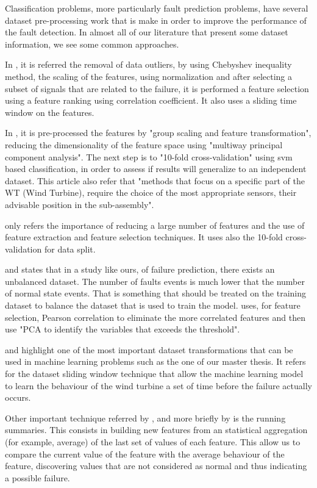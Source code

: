 Classification problems, more particularly fault prediction problems, have several dataset pre-processing work that is make in order to improve the performance of the fault detection. In almost all of our literature that present some dataset information, we see some common approaches.

In \cite{OLD_19_WIND}, it is referred the removal of data outliers, by using Chebyshev inequality method, the scaling of the features, using normalization and after selecting a subset of signals that are related to the failure, it is performed a feature selection using a feature ranking using correlation coefficient. It also uses a sliding time window on the features.

In \cite{N_2_WIND}, it is pre-processed the features by "group scaling and feature transformation", reducing the dimensionality of the feature space using "multiway principal component analysis". The next step is to "10-fold cross-validation" using \acrshort{svm} based classification, in order to assess if results will generalize to an independent dataset. This article also refer that "methods that focus on a specific part of the WT (Wind Turbine), require the choice of the most appropriate sensors, their advisable position in the sub-assembly".

\cite{39_WIND} only refers the importance of reducing a large number of features and the use of feature extraction and feature selection techniques. It uses also the 10-fold cross-validation for data split.

\cite{N_3_WIND} and \cite{OLD_41_WIND} states that in a study like ours, of failure prediction, there exists an unbalanced dataset. The number of faults events is much lower that the number of normal state events. That is something that should be treated on the training dataset to balance the dataset that is used to train the model.
\cite{N_4_WIND} uses, for feature selection, Pearson correlation to eliminate the more correlated features and then use "PCA to identify the variables that exceeds the threshold".

\cite{TDC_1} and \cite{MED_1} highlight one of the most important dataset transformations that can be used in machine learning problems such as the one of our master thesis. It refers for the dataset sliding window technique that allow the machine learning model to learn the behaviour of the wind turbine a set of time before the failure actually occurs.

Other important technique referred by \cite{MED_1}, and more briefly by \cite{N_7_GENERAL} is the running summaries. This consists in building new features from an statistical aggregation (for example, average) of the last set of values of each feature. This allow us to compare the current value of the feature with the average behaviour of the feature, discovering values that are not considered as normal and thus indicating a possible failure.

